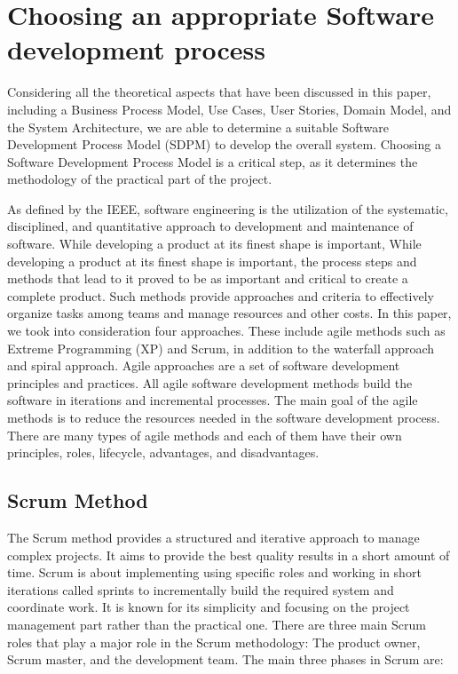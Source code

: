 \documentclass[conference,onecolumn]{IEEEtran}
\begin{document}
\section{Choosing an appropriate Software development process}

Considering all the theoretical aspects that have been discussed in this paper, including a Business Process Model, Use Cases, User Stories, Domain Model, and the System Architecture, we are able to determine a suitable Software Development Process Model (SDPM) to develop the overall system. Choosing a Software Development Process Model is a critical step, as it determines the methodology of the practical part of the project.

As defined by the IEEE, software engineering is the utilization of the systematic, disciplined, and quantitative approach to development and maintenance of software. While developing a product at its finest shape is important, While developing a product at its finest shape is important, the process steps and methods that lead to it proved to be as important and critical to create a complete product. Such methods provide approaches and criteria to effectively organize tasks among teams and manage resources and other costs.  In this paper, we took into consideration four approaches. These include agile methods such as Extreme Programming (XP) and Scrum, in addition to the waterfall approach and spiral approach.
Agile approaches are a set of software development principles and practices. All agile software development methods build the software in iterations and incremental processes. The main goal of the agile methods is to reduce the resources needed in the software development process. There are many types of agile methods and each of them have their own principles, roles, lifecycle, advantages, and disadvantages.


\subsection{Scrum Method}
The Scrum method provides a structured and iterative approach to manage complex projects. It aims to provide the best quality results in a short amount of time. Scrum is about implementing using specific roles and working in short iterations called sprints to incrementally build the required system and coordinate work. It is known for its simplicity and focusing on the project management part rather than the practical one. There are three main Scrum roles that play a major role in the Scrum methodology: The product owner, Scrum master, and the development team.
The main three phases in Scrum are:
\end{document}
